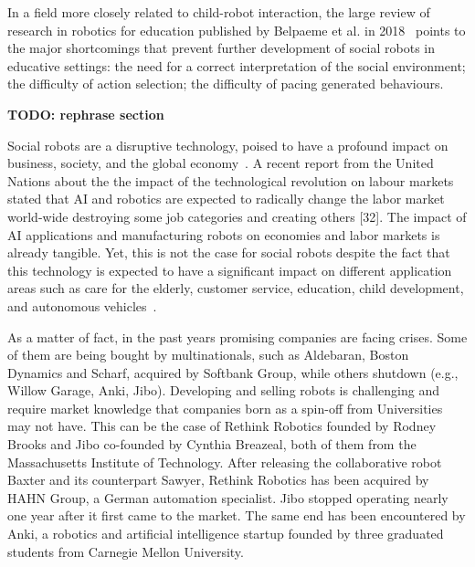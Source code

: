 \documentclass[11pt,a4paper]{report}
\newcommand{\TODO}[1]{{\color{red}\textbf{TODO: #1}}}
\begin{document}
In a field more closely related to child-robot interaction, the large review of
research in robotics for education published by Belpaeme et al. in
2018~\cite{belpaeme2018social} points to the major shortcomings that prevent
further development of social robots in educative settings: the need for a correct
interpretation of the social environment; the difficulty of action selection;
the difficulty of pacing generated behaviours.

\TODO{rephrase section}

Social robots are a disruptive technology, poised to have a profound impact on
business, society, and the global economy~\cite{williams2020social}. A recent report from the United
Nations about the the impact of the technological revolution on labour markets
stated that AI and robotics are expected to radically change the labor market
world-wide destroying some job categories and creating others [32]. The impact
of AI applications and manufacturing robots on economies and labor markets is
already tangible. Yet, this is not the case for social robots despite the fact that
this technology is expected to have a significant impact on different application
areas such as care for the elderly, customer service, education, child development,
and autonomous vehicles~\cite{baillie2019challenges}.

As a matter of fact, in the past years promising companies are facing crises.
Some of them are being bought by multinationals, such as Aldebaran, Boston
Dynamics and Scharf, acquired by Softbank Group, while others shutdown (e.g.,
Willow Garage, Anki, Jibo). Developing and selling robots is challenging and
require market knowledge that companies born as a spin-off from Universities may
not have. This can be the case of Rethink Robotics founded by Rodney Brooks and
Jibo co-founded by Cynthia Breazeal, both of them from the Massachusetts
Institute of Technology. After releasing the collaborative robot Baxter and its
counterpart Sawyer, Rethink Robotics has been acquired by HAHN Group, a German
automation specialist. Jibo stopped operating nearly one year after it first
came to the market. The same end has been encountered by Anki, a robotics and
artificial intelligence startup founded by three graduated students from
Carnegie Mellon University.
\end{document}
